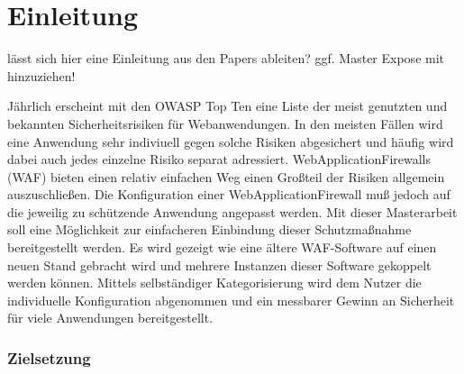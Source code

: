 \chapter{Einleitung}


\begin{neu}
lässt sich hier eine Einleitung aus den Papers ableiten? ggf. Master Expose mit hinzuziehen!
  
\end{neu}
Jährlich erscheint mit den OWASP Top Ten \cite{owasptopten}  eine Liste der meist genutzten und bekannten Sicherheitsrisiken für Webanwendungen. In den meisten Fällen wird eine Anwendung sehr indiviuell gegen solche Risiken abgesichert und häufig wird dabei auch jedes einzelne Risiko separat adressiert. WebApplicationFirewalls (WAF) bieten einen relativ einfachen Weg einen Großteil der Risiken allgemein auszuschließen. Die Konfiguration einer WebApplicationFirewall muß jedoch auf die jeweilig zu schützende Anwendung angepasst werden. Mit dieser Masterarbeit soll eine Möglichkeit zur einfacheren Einbindung dieser Schutzmaßnahme bereitgestellt werden. Es wird gezeigt wie eine ältere WAF-Software auf einen neuen Stand gebracht wird und mehrere Instanzen dieser Software gekoppelt werden können. Mittels selbständiger Kategorisierung wird dem Nutzer die individuelle Konfiguration abgenommen und ein messbarer Gewinn an Sicherheit für viele Anwendungen bereitgestellt. 


\subsection{Zielsetzung}

